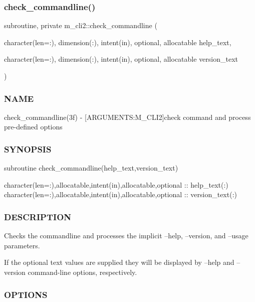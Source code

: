 \subsubsection{\texorpdfstring{check\+\_\+commandline()}{check\_commandline()}}
{\footnotesize\ttfamily subroutine, private m\+\_\+cli2\+::check\+\_\+commandline (\begin{DoxyParamCaption}\item[{character(len=\+:), dimension(\+:), intent(in), optional, allocatable}]{help\+\_\+text,  }\item[{character(len=\+:), dimension(\+:), intent(in), optional, allocatable}]{version\+\_\+text }\end{DoxyParamCaption})\hspace{0.3cm}{\ttfamily [private]}}



\subsubsection*{N\+A\+ME}

check\+\_\+commandline(3f) -\/ \mbox{[}A\+R\+G\+U\+M\+E\+N\+TS\+:M\+\_\+\+C\+L\+I2\mbox{]}check command and process pre-\/defined options 

\subsubsection*{S\+Y\+N\+O\+P\+S\+IS}

\begin{DoxyVerb}  subroutine check_commandline(help_text,version_text)

   character(len=:),allocatable,intent(in),allocatable,optional :: help_text(:)
   character(len=:),allocatable,intent(in),allocatable,optional :: version_text(:)
\end{DoxyVerb}


\subsubsection*{D\+E\+S\+C\+R\+I\+P\+T\+I\+ON}

Checks the commandline and processes the implicit --help, --version, and --usage parameters.

If the optional text values are supplied they will be displayed by --help and --version command-\/line options, respectively.

\subsubsection*{O\+P\+T\+I\+O\+NS}

